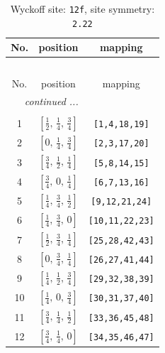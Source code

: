 \documentclass[fleqn,8pt]{jsarticle}
\begin{document}
\begin{longtable}{ccc}
\caption{Wyckoff site: {\tt 12f}, site symmetry: {\tt 2.22}}
 \\
 \hline \hline
No. & position & mapping \\ \hline \endfirsthead

\multicolumn{2}{l}{\tablename\ \thetable{}} \\
 \hline \hline
No. & position & mapping \\ \hline \endhead

 \hline \hline
\multicolumn{2}{r}{\footnotesize\it continued ...} \\ \endfoot

 \hline \hline
\multicolumn{2}{r}{} \\ \endlastfoot

1 & $\left[ \frac{1}{2},\, \frac{1}{4},\, \frac{3}{4} \right]$ & {\tt [1,4,18,19]} \\ \hline
2 & $\left[ 0,\, \frac{1}{4},\, \frac{3}{4} \right]$ & {\tt [2,3,17,20]} \\ \hline
3 & $\left[ \frac{3}{4},\, \frac{1}{2},\, \frac{1}{4} \right]$ & {\tt [5,8,14,15]} \\ \hline
4 & $\left[ \frac{3}{4},\, 0,\, \frac{1}{4} \right]$ & {\tt [6,7,13,16]} \\ \hline
5 & $\left[ \frac{1}{4},\, \frac{3}{4},\, \frac{1}{2} \right]$ & {\tt [9,12,21,24]} \\ \hline
6 & $\left[ \frac{1}{4},\, \frac{3}{4},\, 0 \right]$ & {\tt [10,11,22,23]} \\ \hline
7 & $\left[ \frac{1}{2},\, \frac{3}{4},\, \frac{1}{4} \right]$ & {\tt [25,28,42,43]} \\ \hline
8 & $\left[ 0,\, \frac{3}{4},\, \frac{1}{4} \right]$ & {\tt [26,27,41,44]} \\ \hline
9 & $\left[ \frac{1}{4},\, \frac{1}{2},\, \frac{3}{4} \right]$ & {\tt [29,32,38,39]} \\ \hline
10 & $\left[ \frac{1}{4},\, 0,\, \frac{3}{4} \right]$ & {\tt [30,31,37,40]} \\ \hline
11 & $\left[ \frac{3}{4},\, \frac{1}{4},\, \frac{1}{2} \right]$ & {\tt [33,36,45,48]} \\ \hline
12 & $\left[ \frac{3}{4},\, \frac{1}{4},\, 0 \right]$ & {\tt [34,35,46,47]} \\
\end{longtable}
\renewcommand{\arraystretch}{1.2}
\end{document}
